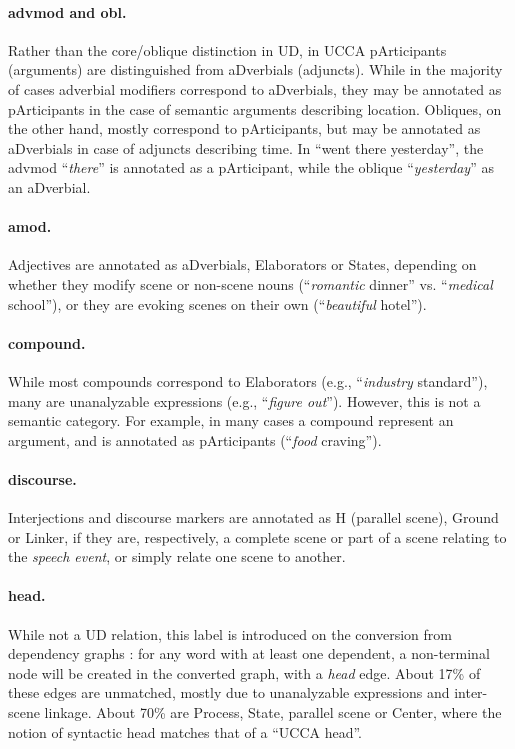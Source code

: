 \documentclass[11pt,a4paper]{article}
\begin{document}
\paragraph{advmod and obl.}
Rather than the core/oblique distinction in UD,
in UCCA pArticipants (arguments) are distinguished from aDverbials (adjuncts).
While in the majority of cases adverbial modifiers correspond to aDverbials,
they may be annotated as pArticipants in the case of semantic arguments describing location.
Obliques, on the other hand, mostly correspond to pArticipants, but may be
annotated as aDverbials in case of adjuncts describing time.
In ``went there yesterday'', the advmod ``\textit{there}'' is annotated as a pArticipant,
while the oblique ``\textit{yesterday}'' as an aDverbial.

\paragraph{amod.}
Adjectives are annotated as aDverbials, Elaborators or States,
depending on whether they modify scene or non-scene nouns
(``\textit{romantic} dinner'' vs. ``\textit{medical} school''), or
they are evoking scenes on their own (``\textit{beautiful} hotel'').

\paragraph{compound.}
While most compounds correspond to Elaborators (e.g., ``\textit{industry} standard''),
many are unanalyzable expressions (e.g., ``\textit{figure out}'').
However, this is not a semantic category.
For example, in many cases a compound represent an argument,
and is annotated as pArticipants (``\textit{food} craving'').

\paragraph{discourse.}
Interjections and discourse markers are annotated as H (parallel scene), Ground or Linker,
if they are, respectively, a complete scene or part of a scene relating to the \textit{speech event},
or simply relate one scene to another.

\paragraph{head.}
While not a UD relation, this label is introduced on the conversion from dependency graphs
\cite{hershcovich2018multitask}: for any word with at least one dependent,
a non-terminal node will be created in the converted graph, with a \textit{head} edge.
About 17\% of these edges are unmatched, mostly due to unanalyzable expressions and inter-scene linkage.
About 70\% are Process, State, parallel scene or Center,
where the notion of syntactic head matches that of a ``UCCA head''.
\end{document}
